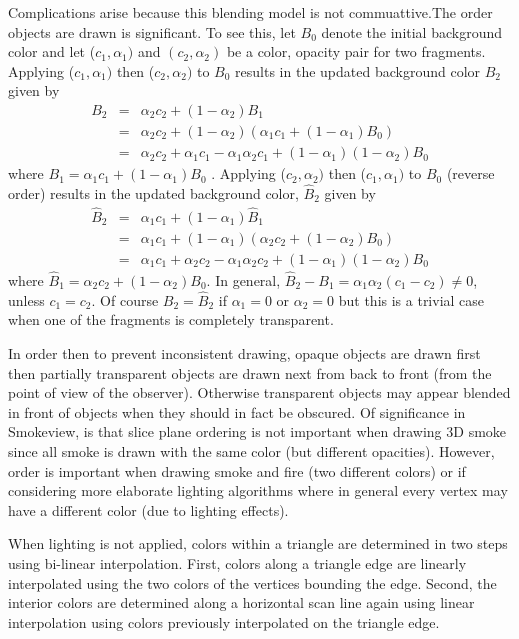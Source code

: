 \documentclass[11pt,twoside]{book}
\begin{document}
Complications arise because this blending model is not commuattive.The order objects are drawn
is significant.
To see this, let $B_0$ denote the initial background color and let ($c_1,\alpha_1)$
and $(c_2,\alpha_2)$ be a color, opacity pair for two fragments.  Applying ($c_1,\alpha_1)$
then ($c_2,\alpha_2)$ to $B_0$ results in the updated background color $B_2$ given by
\begin{eqnarray*}
B_2&=&\alpha_2c_2+(1-\alpha_2)B_1\\
&=&\alpha_2c_2+(1-\alpha_2)(\alpha_1c_1+(1-\alpha_1)B_0)\\
&=&\alpha_2c_2+\alpha_1c_1-\alpha_1\alpha_2c_1+(1-\alpha_1)(1-\alpha_2)B_0
\end{eqnarray*}
where $B_1=\alpha_1c_1+(1-\alpha_1)B_0$ .  Applying ($c_2,\alpha_2)$
then ($c_1,\alpha_1)$ to $B_0$ (reverse order) results in the updated background color, $\hat{B}_2$ given by
\begin{eqnarray*}
\hat{B}_2&=&\alpha_1c_1+(1-\alpha_1)\hat{B}_1\\
&=&\alpha_1c_1+(1-\alpha_1)(\alpha_2c_2+(1-\alpha_2)B_0)\\
&=&\alpha_1c_1+\alpha_2c_2-\alpha_1\alpha_2c_2+(1-\alpha_1)(1-\alpha_2)B_0
\end{eqnarray*}
where $\hat{B}_1=\alpha_2c_2+(1-\alpha_2)B_0$.
In general, $\hat{B}_2-B_1=\alpha_1\alpha_2(c_1-c_2)\ne 0$, unless $c_1=c_2$.  Of course $B_2=\hat{B}_2$ if $\alpha_1=0$ or $\alpha_2=0$ but this is a trivial case when one of the fragments is completely transparent.

In order then to prevent inconsistent drawing, opaque
objects are drawn first then partially transparent objects
are drawn next from back to front (from the point of view of
the observer). Otherwise transparent objects may appear blended in
front of objects when they should in fact be obscured.
Of significance in Smokeview, is that slice plane ordering is not important when drawing 3D smoke since all smoke is drawn with the same color (but different opacities).  However, order is important when drawing smoke and fire (two different colors) or if considering more elaborate lighting algorithms where in general every vertex may have a different color (due to lighting effects).

When lighting is not applied, colors within a triangle are
determined in two steps using bi-linear interpolation. First,
colors along a triangle edge are linearly interpolated using the
two colors of the vertices bounding the edge. Second, the interior
colors are determined along a horizontal scan line again using
linear interpolation using colors previously interpolated on the
triangle edge.
\end{document}
